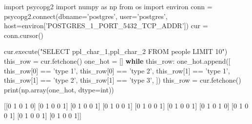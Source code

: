\documentclass[]{report}
\newenvironment{Shaded}{}{}
\newcommand{\DecValTok}[1]{\textcolor[rgb]{0.25,0.63,0.44}{{#1}}}
\newcommand{\StringTok}[1]{\textcolor[rgb]{0.25,0.44,0.63}{{#1}}}
\newcommand{\ImportTok}[1]{{#1}}
\newcommand{\ControlFlowTok}[1]{\textcolor[rgb]{0.00,0.44,0.13}{\textbf{{#1}}}}
\newcommand{\OperatorTok}[1]{\textcolor[rgb]{0.40,0.40,0.40}{{#1}}}
\newcommand{\BuiltInTok}[1]{{#1}}
\newcommand{\ExtensionTok}[1]{{#1}}
\newcommand{\NormalTok}[1]{{#1}}
\begin{document}
\begin{Shaded}
\begin{Highlighting}[]
\ImportTok{import} \NormalTok{psycopg2}
\ImportTok{import} \NormalTok{numpy }\ImportTok{as} \NormalTok{np}
\ImportTok{from} \NormalTok{os }\ImportTok{import} \NormalTok{environ}
\NormalTok{conn }\OperatorTok{=} \NormalTok{psycopg2.}\ExtensionTok{connect}\NormalTok{(dbname}\OperatorTok{=}\StringTok{'postgres'}\NormalTok{, }
                        \NormalTok{user}\OperatorTok{=}\StringTok{'postgres'}\NormalTok{, }
                        \NormalTok{host}\OperatorTok{=}\NormalTok{environ[}\StringTok{'POSTGRES_1_PORT_5432_TCP_ADDR'}\NormalTok{])}
\NormalTok{cur }\OperatorTok{=} \NormalTok{conn.cursor()}

 \NormalTok{cur.execute(}\StringTok{"SELECT ppl_char_1,ppl_char_2 FROM people LIMIT 10"}\NormalTok{)}
\NormalTok{this_row }\OperatorTok{=} \NormalTok{cur.fetchone()}
\NormalTok{one_hot }\OperatorTok{=} \NormalTok{[]}
\ControlFlowTok{while} \NormalTok{this_row:}
    \NormalTok{one_hot.append([}
            \NormalTok{this_row[}\DecValTok{0}\NormalTok{] }\OperatorTok{==} \StringTok{'type 1'}\NormalTok{,}
            \NormalTok{this_row[}\DecValTok{0}\NormalTok{] }\OperatorTok{==} \StringTok{'type 2'}\NormalTok{,}
            \NormalTok{this_row[}\DecValTok{1}\NormalTok{] }\OperatorTok{==} \StringTok{'type 1'}\NormalTok{,}
            \NormalTok{this_row[}\DecValTok{1}\NormalTok{] }\OperatorTok{==} \StringTok{'type 2'}\NormalTok{,}
            \NormalTok{this_row[}\DecValTok{1}\NormalTok{] }\OperatorTok{==} \StringTok{'type 3'}\NormalTok{,}
        \NormalTok{])}
    \NormalTok{this_row }\OperatorTok{=} \NormalTok{cur.fetchone()}
\BuiltInTok{print}\NormalTok{(np.array(one_hot, dtype}\OperatorTok{=}\BuiltInTok{int}\NormalTok{))}

\NormalTok{[[}\DecValTok{0} \DecValTok{1} \DecValTok{0} \DecValTok{1} \DecValTok{0}\NormalTok{]}
 \NormalTok{[}\DecValTok{0} \DecValTok{1} \DecValTok{0} \DecValTok{0} \DecValTok{1}\NormalTok{]}
 \NormalTok{[}\DecValTok{0} \DecValTok{1} \DecValTok{0} \DecValTok{0} \DecValTok{1}\NormalTok{]}
 \NormalTok{[}\DecValTok{0} \DecValTok{1} \DecValTok{0} \DecValTok{0} \DecValTok{1}\NormalTok{]}
 \NormalTok{[}\DecValTok{0} \DecValTok{1} \DecValTok{0} \DecValTok{0} \DecValTok{1}\NormalTok{]}
 \NormalTok{[}\DecValTok{0} \DecValTok{1} \DecValTok{0} \DecValTok{0} \DecValTok{1}\NormalTok{]}
 \NormalTok{[}\DecValTok{0} \DecValTok{1} \DecValTok{0} \DecValTok{1} \DecValTok{0}\NormalTok{]}
 \NormalTok{[}\DecValTok{0} \DecValTok{1} \DecValTok{0} \DecValTok{0} \DecValTok{1}\NormalTok{]}
 \NormalTok{[}\DecValTok{0} \DecValTok{1} \DecValTok{0} \DecValTok{0} \DecValTok{1}\NormalTok{]}
 \NormalTok{[}\DecValTok{0} \DecValTok{1} \DecValTok{0} \DecValTok{0} \DecValTok{1}\NormalTok{]]}
 
\end{Highlighting}
\end{Shaded}
\end{document}
